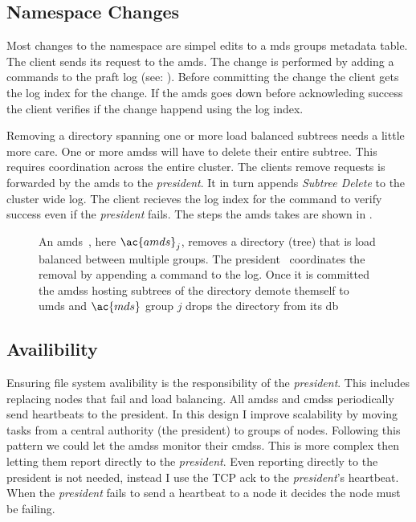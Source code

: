\subsection*{Namespace Changes}
Most changes to the namespace are simpel edits to a \ac{mds} groups metadata table. The client sends its request to the \ac{amds}. The change is performed by adding a commands to the \ac{praft} log (see: ). Before committing the change the client gets the log index for the change. If the \ac{amds} goes down before acknowleding success the client verifies if the change happend using the log index.

Removing a directory spanning one or more load balanced subtrees needs a little more care. One or more \acp{amds} will have to delete their entire subtree. This requires coordination across the entire cluster. The clients remove requests is forwarded by the \ac{amds} to the \textit{president}. It in turn appends \textsl{Subtree Delete} to the cluster wide log. The client recieves the log index for the command to verify success even if the \textit{president} fails. The steps the \ac{amds} takes are shown in . 
%
\begin{figure}[htbp]
	\centering
	
	\caption{An \ac{amds}~\amdsLeg{}, here $\ac{amds}_j$, removes a directory (tree) that is load balanced between multiple groups. The president~\presidentLeg{} coordinates the removal by appending a command to the log. Once it is committed the \acp{amds} hosting subtrees of the directory demote themself to \ac{umds} and $\ac{mds}$ group $j$ drops the directory from its db}
	\label{fig:rm}
\end{figure}
%
\subsection{Availibility}
Ensuring file system avalibility is the responsibility of the \textit{president}. This includes replacing nodes that fail and load balancing. All \acp{amds} and \acp{cmds} periodically send heartbeats to the president. In this design I improve scalability by moving tasks from a central authority (the president) to groups of nodes. Following this pattern we could let the \acp{amds} monitor their \acp{cmds}. This is more complex then letting them report directly to the \textit{president}. Even reporting directly to the president is not needed, instead I use the TCP ack to the \textit{president}'s \raft{} heartbeat. When the \textit{president} fails to send a \raft{} heartbeat to a node it decides the node must be failing.

